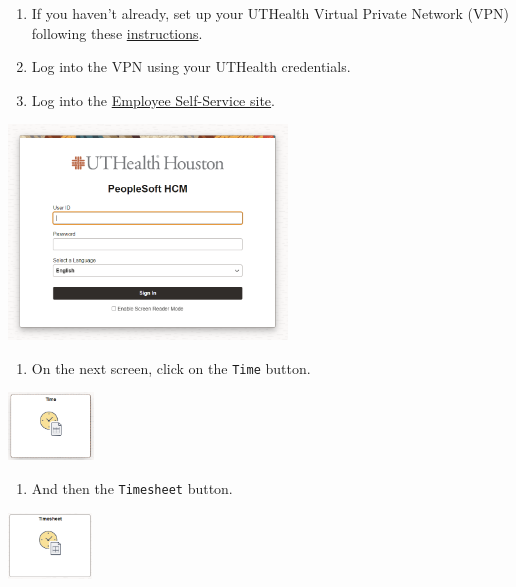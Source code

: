 \documentclass[
  letterpaper,
  DIV=11,
  numbers=noendperiod]{scrreprt}
\providecommand{\tightlist}{%
  \setlength{\itemsep}{0pt}\setlength{\parskip}{0pt}}\usepackage{longtable,booktabs,array}
\begin{document}
\begin{enumerate}
\def\labelenumi{\arabic{enumi}.}
\tightlist
\item
  If you haven't already, set up your UTHealth Virtual Private Network
  (VPN) following these
  \href{https://inside.uth.edu/itsecurity/secops/vpn/index.htm}{instructions}.
\item
  Log into the VPN using your UTHealth credentials.
\item
  Log into the \href{https://hrms.uth.tmc.edu/hprd/signon.html}{Employee
  Self-Service site}.
\end{enumerate}

\begin{center}
\includegraphics[width=2.92in,height=\textheight]{chapters/../graphics/self_service_login.png}
\end{center}

\begin{enumerate}
\def\labelenumi{\arabic{enumi}.}
\setcounter{enumi}{3}
\tightlist
\item
  On the next screen, click on the \texttt{Time} button.
\end{enumerate}

\begin{center}
\includegraphics[width=0.9in,height=\textheight]{chapters/../graphics/time.png}
\end{center}

\begin{enumerate}
\def\labelenumi{\arabic{enumi}.}
\setcounter{enumi}{4}
\tightlist
\item
  And then the \texttt{Timesheet} button.
\end{enumerate}

\begin{center}
\includegraphics[width=0.87in,height=\textheight]{chapters/../graphics/timesheet_button.png}
\end{center}
\end{document}
